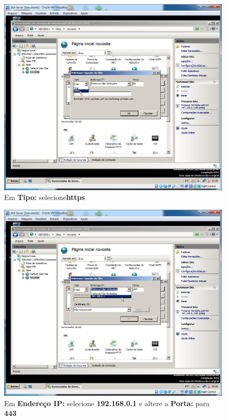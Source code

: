 \documentclass[10pt]{article}
\begin{document}
\begin{figure}[H]
    \centering
    \caption{Em \textbf{Tipo:} selecione\textbf{https}}
    \label{fig:5532047}
    \includegraphics[width=\linewidth]{images/IIS/criando_um_novo_site/047.png}
\end{figure}
\begin{figure}[H]
    \centering
    \caption{Em \textbf{Endereço IP:} selecione \textbf{192.168.0.1} e altere a \textbf{Porta:} para \textbf{443}}
    \label{fig:5532048}
    \includegraphics[width=\linewidth]{images/IIS/criando_um_novo_site/048.png}
\end{figure}
\end{document}

